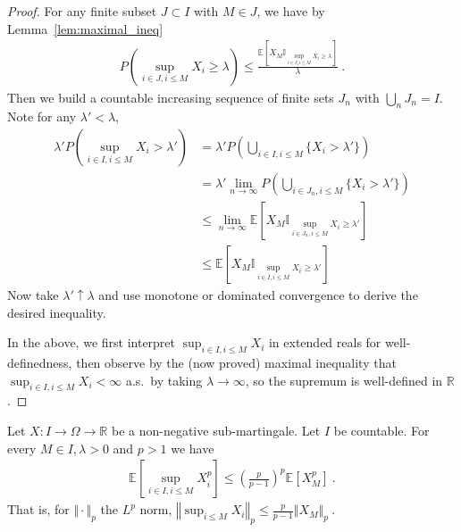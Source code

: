 \begin{proof}
  \leanok
For any finite subset $J \subset I$ with $M \in J$, we have by Lemma~\ref{lem:maximal_ineq}
\begin{align*}
  P\left( \sup_{i\in J, i \le M}X_i\geq\lambda \right)
  \le \frac{\mathbb{E}\left[X_{M} \mathbb{I}_{\sup_{i \in J, i \le M}X_i \ge \lambda}\right]}{\lambda}
  \: .
\end{align*}
Then we build a countable increasing sequence of finite sets $J_n$ with $\bigcup_nJ_n=I$.
Note for any $\lambda' < \lambda$,
\begin{align*}
  \lambda' P\left( \sup_{i\in I, i\leq M}X_i>\lambda' \right)
  &= \lambda' P\left( \bigcup_{i\in I, i\leq M}\{X_i>\lambda'\} \right) \\
  &= \lambda' \lim_{n\to\infty} P\left( \bigcup_{i\in J_n, i\leq M}\{X_i>\lambda'\} \right) \\
  &\le \lim_{n\to\infty} \mathbb{E}\left[X_{M} \mathbb{I}_{\sup_{i \in J_n, i \le M}X_i \ge \lambda'}\right] \\
  &\le \mathbb{E}\left[X_{M} \mathbb{I}_{\sup_{i \in I, i \le M}X_i \ge \lambda'}\right]
\end{align*}
Now take $\lambda'\uparrow\lambda$ and use monotone or dominated convergence to derive the desired inequality.

In the above, we first interpret $\sup_{i\in I, i\leq M}X_i$ in extended reals for well-definedness,
then observe by the (now proved) maximal inequality that $\sup_{i\in I, i\leq M}X_i < \infty$ a.s.\ by taking $\lambda\to\infty$,
so the supremum is well-defined in $\mathbb{R}$.
\end{proof}


\begin{lemma}\label{lem:doob_Lp_countable}
  Let $X : I \rightarrow \Omega \rightarrow \mathbb{R}$ be a non-negative sub-martingale. Let $I$ be countable.
  For every $M\in I,\lambda > 0$ and $p>1$ we have
  \begin{align*}
    \mathbb{E}\left[ \sup_{i\in I, i \leq M}X_i^p \right]
    \leq \left(\frac{p}{p-1}\right)^p\mathbb{E}[X_M^p]
    \: .
  \end{align*}
  That is, for $\Vert \cdot \Vert_p$ the $L^p$ norm,
  $\left\Vert \sup_{i \le M}  X_i  \right\Vert_p
    \leq \frac{p}{p-1} \left\Vert X_M \right\Vert_p
    \: .$
\end{lemma}


